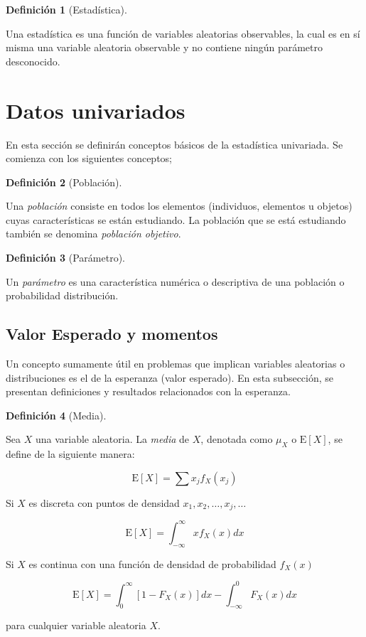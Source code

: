 \documentclass[
  us-letterpaper,
]{scrreprt}
\theoremstyle{definition}
\theoremstyle{plain}
\theoremstyle{plain}
\theoremstyle{definition}
\newtheorem{definition}{Definición}[chapter]
\theoremstyle{remark}
\begin{document}
\begin{definition}[Estadística]\protect\hypertarget{def-estad}{}\label{def-estad}

Una estadística es una función de variables aleatorias observables, la
cual es en sí misma una variable aleatoria observable y no contiene
ningún parámetro desconocido.

\end{definition}

\section{Datos univariados}\label{datos-univariados}

En esta sección se definirán conceptos básicos de la estadística
univariada. Se comienza con los siguientes conceptos;

\begin{definition}[Población]\protect\hypertarget{def-pobla}{}\label{def-pobla}

Una \emph{población} consiste en todos los elementos (individuos,
elementos u objetos) cuyas características se están estudiando. La
población que se está estudiando también se denomina \emph{población
objetivo}.

\end{definition}

\begin{definition}[Parámetro]\protect\hypertarget{def-param}{}\label{def-param}

Un \emph{parámetro} es una característica numérica o descriptiva de una
población o probabilidad distribución.

\end{definition}

\subsection{Valor Esperado y momentos}\label{valor-esperado-y-momentos}

Un concepto sumamente útil en problemas que implican variables
aleatorias o distribuciones es el de la esperanza (valor esperado). En
esta subsección, se presentan definiciones y resultados relacionados con
la esperanza.

\begin{definition}[Media]\protect\hypertarget{def-mean}{}\label{def-mean}

Sea \(X\) una variable aleatoria. La \emph{media} de \(X\), denotada
como \(\mu_X\) o \(\mathrm E[X]\), se define de la siguiente manera:

\[ \mathrm E[X]= \sum x_jf_X(x_j) \]

Si \(X\) es discreta con puntos de densidad
\(x_1, x_2, \ldots, x_j, \ldots\)

\[ \mathrm E[X]=\int_{-\infty}^\infty x f_X(x)dx \]

Si \(X\) es continua con una función de densidad de probabilidad
\(f_X(x)\)

\[ \mathrm E[X]=\int_0^\infty [1-F_X(x)]dx-\int_{-\infty}^0 F_X(x) dx \]

para cualquier variable aleatoria \(X\).

\end{definition}
\end{document}

